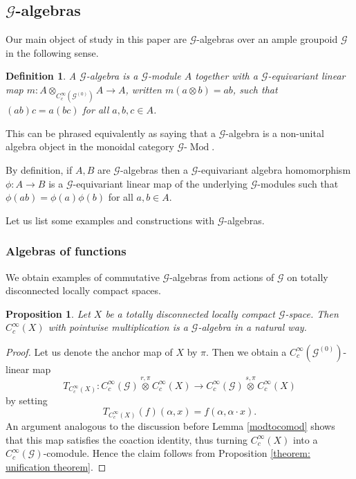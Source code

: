 \documentclass{amsart}
\newtheorem{dfn}[thm]{Definition}
\newtheorem{prop}[thm]{Proposition}
\newcommand{\G}{\mathcal{G}}
\newcommand{\ccinfty}{C_c^\infty}
\begin{document}
\subsection{$ \G $-algebras}

Our main object of study in this paper are $ \G $-algebras over an ample groupoid $ \G $ in the following sense. 

\begin{dfn} \label{Galgebra}
A $ \G $-algebra is a $ \G $-module $ A $ together with a $ \G $-equivariant linear map $ m: A \otimes_{\ccinfty(\G^{(0)})} A \rightarrow A $, written $ m(a \otimes b) = ab $, such that $ (ab)c = a(bc) $ for all $ a,b,c \in A $. 
\end{dfn}

This can be phrased equivalently as saying that a $ \G $-algebra is a non-unital algebra object in the monoidal category $ \G\mbox{-}\operatorname{Mod} $. 

By definition, if $ A, B $ are $ \G $-algebras then a $ \G $-equivariant algebra homomorphism $ \phi: A \rightarrow B $ is a $ \G $-equivariant linear map of the underlying $ \G $-modules such that $ \phi(ab) = \phi(a) \phi(b) $ for all $ a,b \in A $. 

Let us list some examples and  constructions with $ \G $-algebras. 

\subsubsection{Algebras of functions}

We obtain examples of commutative $ \G $-algebras from actions of $ \G $ on totally disconnected locally compact spaces.  

\begin{prop} \label{functionsgmodule}
Let $ X $ be a totally disconnected locally compact $ \G $-space. Then $ \ccinfty(X) $ with pointwise multiplication is a $ \G $-algebra in a natural way. 
\end{prop}

\begin{proof}
Let us denote the anchor map of $ X $ by $ \pi $. Then we obtain a $ \ccinfty(\G^{(0)}) $-linear map 
$$ 
T_{\ccinfty(X)}: \ccinfty(\G) \stackrel{r,\pi}{\otimes} \ccinfty(X) \rightarrow \ccinfty(\G) \stackrel{s,\pi}{\otimes} \ccinfty(X) 
$$ 
by setting 
$$
T_{\ccinfty(X)}(f)(\alpha, x) = f(\alpha, \alpha \cdot x). 
$$
An argument analogous to the discussion before Lemma \ref{modtocomod} shows that this map satisfies the coaction identity, thus turning $ \ccinfty(X) $ into a $ \ccinfty(\G) $-comodule. Hence the claim follows from Proposition \ref{theorem: unification theorem}. 
\end{proof} 
\end{document}
